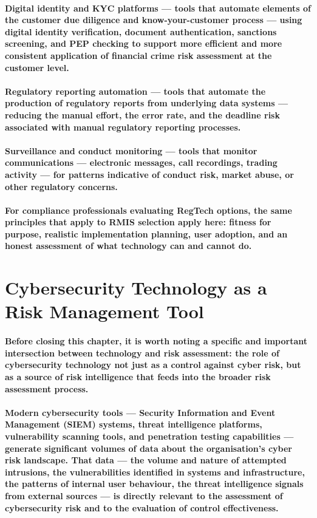 \paragraph{\textbf{Digital identity and KYC platforms} — tools that automate elements of the customer due diligence and know-your-customer process — using digital identity verification, document authentication, sanctions screening, and PEP checking to support more efficient and more consistent application of financial crime risk assessment at the customer level.}
\paragraph{\textbf{Regulatory reporting automation} — tools that automate the production of regulatory reports from underlying data systems — reducing the manual effort, the error rate, and the deadline risk associated with manual regulatory reporting processes.}
\paragraph{\textbf{Surveillance and conduct monitoring} — tools that monitor communications — electronic messages, call recordings, trading activity — for patterns indicative of conduct risk, market abuse, or other regulatory concerns.}
\paragraph{For compliance professionals evaluating RegTech options, the same principles that apply to RMIS selection apply here: fitness for purpose, realistic implementation planning, user adoption, and an honest assessment of what technology can and cannot do.}

\section{Cybersecurity Technology as a Risk Management Tool}
\paragraph{Before closing this chapter, it is worth noting a specific and important intersection between technology and risk assessment: the role of cybersecurity technology not just as a control against cyber risk, but as a source of risk intelligence that feeds into the broader risk assessment process.}
\paragraph{Modern cybersecurity tools — Security Information and Event Management (SIEM) systems, threat intelligence platforms, vulnerability scanning tools, and penetration testing capabilities — generate significant volumes of data about the organisation's cyber risk landscape. That data — the volume and nature of attempted intrusions, the vulnerabilities identified in systems and infrastructure, the patterns of internal user behaviour, the threat intelligence signals from external sources — is directly relevant to the assessment of cybersecurity risk and to the evaluation of control effectiveness.}
